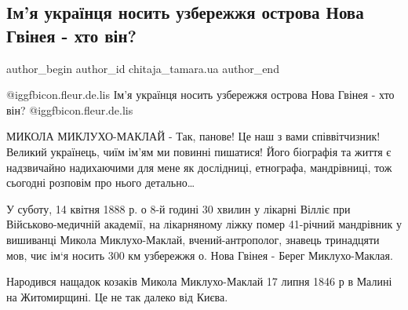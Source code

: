  
 
 
 
 
 
\subsection{Ім'я українця носить узбережжя острова Нова Гвінея - хто він?}
\label{sec:10_11_2022.fb.chitaja_tamara.ua.1.mykluho_maklaj}
 
\ifcmt
 author_begin
   author_id chitaja_tamara.ua
 author_end
\fi

@igg{fbicon.fleur.de.lis} Ім'я українця носить узбережжя острова Нова Гвінея - хто він? @igg{fbicon.fleur.de.lis}

МИКОЛА МИКЛУХО-МАКЛАЙ - Так, панове! Це наш з вами співвітчизник! Великий
українець, чиїм ім'ям ми повинні пишатися! Його біографія та життя є
надзвичайно надихаючими для мене як дослідниці, етнографа, мандрівниці, тож
сьогодні розповім про нього детально…

У суботу, 14 квітня 1888 р. о 8-й годині 30 хвилин у лікарні Вілліє при
Військово-медичній академії, на лікарняному ліжку помер 41-річний мандрівник у
вишиванці Микола Миклухо-Маклай, вчений-антрополог, знавець тринадцяти мов, чиє
ім`я носить 300 км узбережжя о. Нова Гвінея - Берег Миклухо-Маклая.

Народився нащадок козаків Микола Миклухо-Маклай 17 липня 1846 р в Малині на
Житомирщині. Це не так далеко від Києва. 


